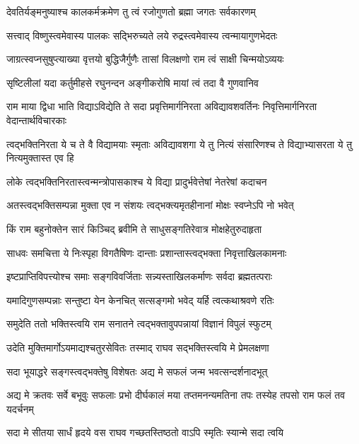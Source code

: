 \twolineshloka
{देवतिर्यङ्मनुष्याश्च कालकर्मक्रमेण तु}
{त्वं रजोगुणतो ब्रह्मा जगतः सर्वकारणम्} %

\twolineshloka
{सत्त्वाद् विष्णुस्त्वमेवास्य पालकः सद्भिरुच्यते}
{लये रुद्रस्त्वमेवास्य त्वन्मायागुणभेदतः} %

\twolineshloka
{जाग्रत्स्वप्नसुषुप्त्याख्या वृत्तयो बुद्धिजैर्गुणैः}
{तासां विलक्षणो राम त्वं साक्षी चिन्मयोऽव्ययः} %

\twolineshloka
{सृष्टिलीलां यदा कर्तुमीहसे रघुनन्दन}
{अङ्गीकरोषि मायां त्वं तदा वै गुणवानिव} %

\threelineshloka
{राम माया द्विधा भाति विद्याऽविद्येति ते सदा}
{प्रवृत्तिमार्गनिरता अविद्यावशवर्तिनः}
{निवृत्तिमार्गनिरता वेदान्तार्थविचारकाः} %

\threelineshloka
{त्वद्भक्तिनिरता ये च ते वै विद्यामयाः स्मृताः}
{अविद्यावशगा ये तु नित्यं संसारिणश्च ते}
{विद्याभ्यासरता ये तु नित्यमुक्तास्त एव हि} %

\twolineshloka
{लोके त्वद्भक्तिनिरतास्त्वन्मन्त्रोपासकाश्च ये}
{विद्या प्रादुर्भवेत्तेषां नेतरेषां कदाचन} %

\twolineshloka
{अतस्त्वद्भक्तिसम्पन्ना मुक्ता एव न संशयः}
{त्वद्भक्त्यमृतहीनानां मोक्षः स्वप्नेऽपि नो भवेत्} %

\twolineshloka
{किं राम बहुनोक्तेन सारं किञ्चिद् ब्रवीमि ते}
{साधुसङ्गतिरेवात्र मोक्षहेतुरुदाहृता} %

\twolineshloka
{साधवः समचित्ता ये निःस्पृहा विगतैषिणः}
{दान्ताः प्रशान्तास्त्वद्भक्ता निवृत्ताखिलकामनाः} %

\twolineshloka
{इष्टप्राप्तिविपत्त्योश्च समाः सङ्गविवर्जिताः}
{सन्न्यस्ताखिलकर्माणः सर्वदा ब्रह्मतत्पराः} %

\twolineshloka
{यमादिगुणसम्पन्नाः सन्तुष्टा येन केनचित्}
{सत्सङ्गमो भवेद् यर्हि त्वत्कथाश्रवणे रतिः} %

\twolineshloka
{समुदेति ततो भक्तिस्त्वयि राम सनातने}
{त्वद्भक्तावुपपन्नायां विज्ञानं विपुलं स्फुटम्} %

\twolineshloka
{उदेति मुक्तिमार्गोऽयमाद्यश्चतुरसेवितः}
{तस्माद् राघव सद्भक्तिस्त्वयि मे प्रेमलक्षणा} %

\twolineshloka
{सदा भूयाद्धरे सङ्गस्त्वद्भक्तेषु विशेषतः}
{अद्य मे सफलं जन्म भवत्सन्दर्शनादभूत्} %

\threelineshloka
{अद्य मे क्रतवः सर्वे बभूवुः सफलाः प्रभो}
{दीर्घकालं मया तप्तमनन्यमतिना तपः}
{तस्येह तपसो राम फलं तव यदर्चनम्} %

\twolineshloka
{सदा मे सीतया सार्धं हृदये वस राघव}
{गच्छतस्तिष्ठतो वाऽपि स्मृतिः स्यान्मे सदा त्वयि} %

